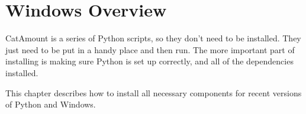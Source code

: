 \chapter{Windows Overview}
\hypertarget{windows-overview}{}

CatAmount is a series of Python scripts, so they don't need to be
installed. They just need to be put in a handy place and then run.
The more important part of installing is making sure Python is
set up correctly, and all of the dependencies installed.

This chapter describes how to install all necessary components
for recent versions of Python and Windows.
